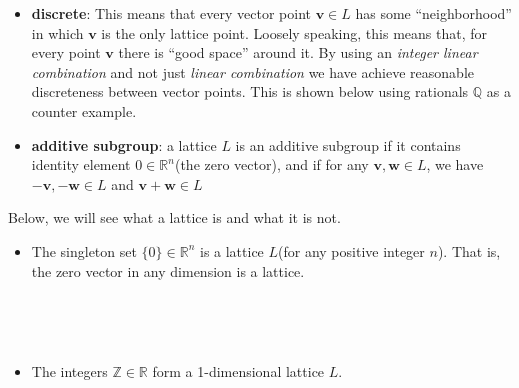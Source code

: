 \documentclass[11pt]{article}
\providecommand{\tightlist}{%
      \setlength{\itemsep}{0pt}\setlength{\parskip}{0pt}}
\begin{document}
\begin{itemize}
\tightlist
\item
  \textbf{discrete}: This means that every vector point
  \(\mathbf{v} \in L\) has some ``neighborhood'' in which \(\mathbf{v}\)
  is the only lattice point. Loosely speaking, this means that, for
  every point \(\mathbf{v}\) there is ``good space'' around it. By using
  an \emph{integer linear combination} and not just \emph{linear
  combination} we have achieve reasonable discreteness between vector
  points. This is shown below using rationals \(\mathbb{Q}\) as a
  counter example.
\item
  \textbf{additive subgroup}: a lattice \(L\) is an additive subgroup if
  it contains identity element \(0 \in \mathbb{R}^n\)(the zero vector),
  and if for any \(\mathbf{v}, \mathbf{w} \in L\), we have
  \(-\mathbf{v}, -\mathbf{w} \in L\) and
  \(\mathbf{v} + \mathbf{w} \in L\)
\end{itemize}

Below, we will see what a lattice is and what it is not.

    \begin{itemize}
\tightlist
\item
  The singleton set \(\{0\} \in \mathbb{R}^n\) is a lattice \(L\)(for
  any positive integer \(n\)). That is, the zero vector in any dimension
  is a lattice.
\end{itemize}

    \begin{center}
    \end{center}
    { \hspace*{\fill} \\}
    
    \begin{center}
    \end{center}
    { \hspace*{\fill} \\}
    
    \begin{itemize}
\tightlist
\item
  The integers \(\mathbb{Z} \in \mathbb{R}\) form a 1-dimensional
  lattice \(L\).
\end{itemize}

    \begin{center}
    \end{center}
    { \hspace*{\fill} \\}
    
\end{document}
